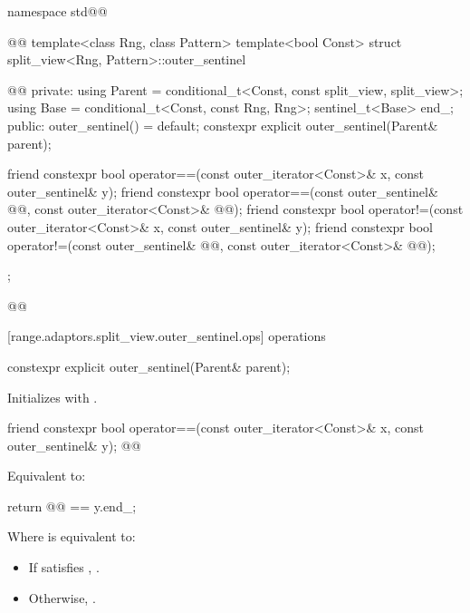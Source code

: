 \begin{codeblock}
namespace std@@ { @@
  template<class Rng, class Pattern>
  template<bool Const>
  struct split_view<Rng, Pattern>::outer_sentinel { @\newtxt{// \expos}@
  private:
    using Parent = conditional_t<Const, const split_view, split_view>;
    using Base   = conditional_t<Const, const Rng, Rng>;
    sentinel_t<Base> end_;
  public:
    outer_sentinel() = default;
    constexpr explicit outer_sentinel(Parent& parent);

    friend constexpr bool operator==(const outer_iterator<Const>& x, const outer_sentinel& y);
    friend constexpr bool operator==(const outer_sentinel& @@, const outer_iterator<Const>& @@);
    friend constexpr bool operator!=(const outer_iterator<Const>& x, const outer_sentinel& y);
    friend constexpr bool operator!=(const outer_sentinel& @@, const outer_iterator<Const>& @@);
  };
}@\oldtxt{\}}@
\end{codeblock}

[range.adaptors.split_view.outer_sentinel.ops]{ operations}

%
\begin{itemdecl}
constexpr explicit outer_sentinel(Parent& parent);
\end{itemdecl}

\begin{itemdescr}
\pnum
\effects Initializes  with .
\end{itemdescr}

%
\begin{itemdecl}
friend constexpr bool operator==(const outer_iterator<Const>& x, const outer_sentinel& y);
@@
\end{itemdecl}

\begin{itemdescr}
\pnum
\effects Equivalent to:
\begin{codeblock}
return @@ == y.end_;
\end{codeblock}

{\color{oldclr}
Where  is equivalent to:
\begin{itemize}
\item If  satisfies , .
\item Otherwise, .
\end{itemize}
} %
\end{itemdescr}

